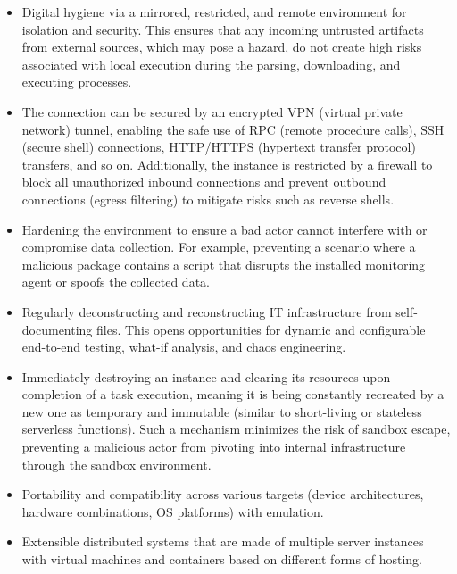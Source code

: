 \begin{itemize}
    \item Digital hygiene via a mirrored, restricted, and remote environment for isolation and security. This ensures that any incoming untrusted artifacts from external sources, which may pose a hazard, do not create high risks associated with local execution during the parsing, downloading, and executing processes.
    \item The connection can be secured by an encrypted VPN (virtual private network) tunnel, enabling the safe use of RPC (remote procedure calls), SSH (secure shell) connections, HTTP/HTTPS (hypertext transfer protocol) transfers, and so on. Additionally, the instance is restricted by a firewall to block all unauthorized inbound connections and prevent outbound connections (egress filtering) to mitigate risks such as reverse shells.
    \item Hardening the environment to ensure a bad actor cannot interfere with or compromise data collection. For example, preventing a scenario where a malicious package contains a script that disrupts the installed monitoring agent or spoofs the collected data.
    \item Regularly deconstructing and reconstructing IT infrastructure from self-documenting files. This opens opportunities for dynamic and configurable end-to-end testing, what-if analysis, and chaos engineering.
    \item Immediately destroying an instance and clearing its resources upon completion of a task execution, meaning it is being constantly recreated by a new one as temporary and immutable (similar to short-living or stateless serverless functions). Such a mechanism minimizes the risk of sandbox escape, preventing a malicious actor from pivoting into internal infrastructure through the sandbox environment.
    \item Portability and compatibility across various targets (device architectures, hardware combinations, OS platforms) with emulation.
    \item Extensible distributed systems that are made of multiple server instances with virtual machines and containers based on different forms of hosting.
\end{itemize}

